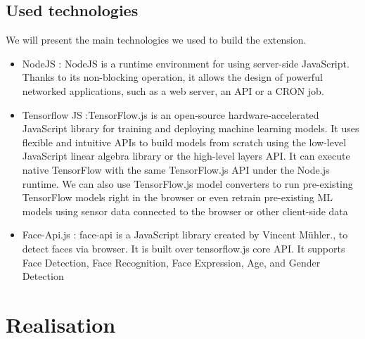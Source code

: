 \documentclass[12pt,a4paper,oneside,english]{book}
\begin{document}
\subsection{Used technologies}
We will present the main technologies we used to build the extension.
\begin{itemize}
\item NodeJS \cite{NodeJS}: NodeJS is a runtime environment for using server-side JavaScript. Thanks to its non-blocking operation, it allows the design of powerful networked applications, such as a web server, an API or a CRON job.
\item Tensorflow JS \cite{tfjs}:TensorFlow.js is an open-source hardware-accelerated JavaScript library for training and deploying machine learning models. It uses flexible and intuitive APIs to build models from scratch using the low-level JavaScript linear algebra library or the high-level layers API. It can execute native TensorFlow with the same TensorFlow.js API under the Node.js runtime. We can also use TensorFlow.js model converters to run pre-existing TensorFlow models right in the browser or even retrain pre-existing ML models using sensor data connected to the browser or other client-side data
\item Face-Api.js \cite{faceapi}: face-api is a JavaScript library created by Vincent Mühler., to detect faces via browser. It is built over tensorflow.js core API. It supports Face Detection, Face Recognition, Face Expression, Age, and Gender Detection
\end{itemize}
\section{Realisation}
\end{document}
